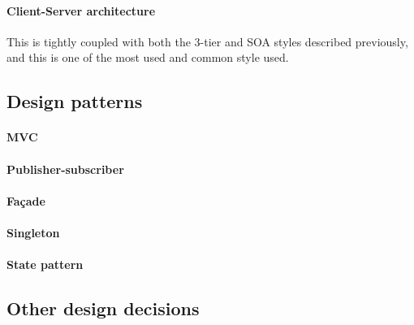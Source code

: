 \paragraph{Client-Server architecture}
This is tightly coupled with both the 3-tier and SOA styles described previously, and this is one of the most used and common style used.
\subsection{Design patterns}
\paragraph{MVC}
\paragraph{Publisher-subscriber}
\paragraph{Fa\c{c}ade}
\paragraph{Singleton}
\paragraph{State pattern}
\subsection{Other design decisions}